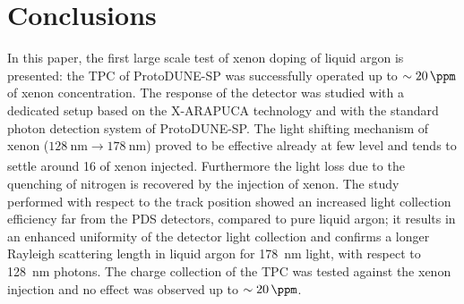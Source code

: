 \documentclass[a4paper]{article}
\begin{document}
\section{Conclusions}
In this paper, the first large scale test of xenon doping of liquid argon is presented: the TPC of ProtoDUNE-SP was successfully operated up to $\sim\SI{20}{\ppm}$ of xenon concentration. The response of the detector was studied with a dedicated setup based on the X-ARAPUCA technology and with the standard photon detection system of ProtoDUNE-SP. The light shifting mechanism of xenon ($\SI{128}{\nano\meter} \xrightarrow[]{} \SI{178}{\nano\meter}$) proved to be effective already at few \si{\ppm} level and tends to settle around \SI{16}{\ppm} of xenon injected. Furthermore the light loss due to the quenching of nitrogen is recovered by the injection of xenon. The study performed with respect to the track position showed an increased light collection efficiency far from the PDS detectors, compared to pure liquid argon; it results in an enhanced uniformity of the detector light collection and confirms a longer Rayleigh scattering length in liquid argon for \SI{178}{\nano\meter} light, with respect to \SI{128}{\nano\meter} photons. The charge collection of the TPC was tested against the xenon injection and no effect was observed up to $\sim\SI{20}{\ppm}$.

\clearpage


\end{document}
